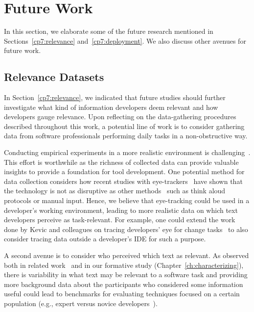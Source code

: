 \section{Future Work}
\label{cp7:future-work}



In this section, we elaborate some of the future research  
mentioned in Sections~\ref{cp7:relevance} and~\ref{cp7:deployment}.
We also discuss other avenues for future work.


\subsection{Relevance Datasets}
\label{cp7:gauging}


In Section~\ref{cp7:relevance}, we indicated that future studies should further investigate 
what kind of information developers deem relevant and how developers gauge relevance.
Upon reflecting on the data-gathering procedures described throughout this work,
a potential line of work is to consider 
gathering data from software professionals performing daily tasks in a non-obstructive way.



Conducting empirical
 experiments in a more realistic environment is challenging~\cite{Kevic2015}.
This effort is worthwhile as
the richness of collected data can provide valuable insights
to provide a foundation for tool development.
One potential method for
data collection 
considers 
how recent studies with eye-trackers~\cite{Cutrell2007, Petrusel2013, sharafi2020}
have shown that the technology is not as disruptive as other 
methods~\cite{Lazar2017} such as think aloud protocols or manual input. 
Hence, we believe that eye-tracking 
could be used in a developer's working environment, 
leading to more realistic data on which text developers perceive as task-relevant.
For example, one could
extend the work done by Kevic and colleagues on
tracing developers' eye for change tasks~\cite{Kevic2015} to
also consider tracing data outside a developer's IDE
for such a purpose.



A second avenue is to consider who perceived which text as relevant.
As observed both in related work~\cite{Crosby1990, Busjahn2015} and in our formative study (Chapter~\ref{ch:characterizing}),
there is variability in what text may be relevant to a software task and 
providing more background data about 
the participants who considered some information useful could lead to benchmarks 
for evaluating techniques
focused on a certain population (e.g., expert versus novice developers~\cite{Crosby1990, Busjahn2015}). 



